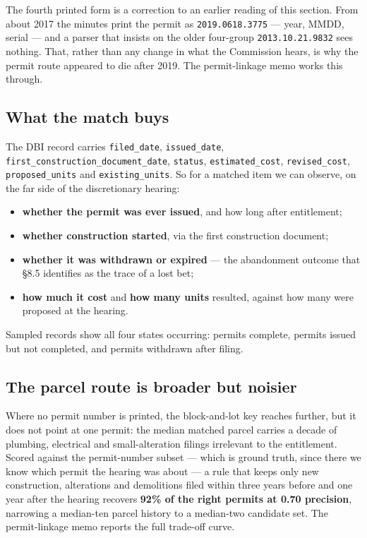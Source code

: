 \documentclass[11pt]{article}
\begin{document}
The fourth printed form is a correction to an earlier reading of this section. From about
2017 the minutes print the permit as \texttt{2019.0618.3775} --- year, MMDD, serial --- and a
parser that insists on the older four-group \texttt{2013.10.21.9832} sees nothing. That,
rather than any change in what the Commission hears, is why the permit route appeared to die
after 2019. The permit-linkage memo works this through.

\subsection{What the match buys}

The DBI record carries \texttt{filed\_date}, \texttt{issued\_date},
\texttt{first\_construction\_document\_date}, \texttt{status}, \texttt{estimated\_cost},
\texttt{revised\_cost}, \texttt{proposed\_units} and \texttt{existing\_units}. So for a matched
item we can observe, on the far side of the discretionary hearing:

\begin{itemize}
\item \textbf{whether the permit was ever issued}, and how long after entitlement;
\item \textbf{whether construction started}, via the first construction document;
\item \textbf{whether it was withdrawn or expired} --- the abandonment outcome that \S8.5
identifies as the trace of a lost bet;
\item \textbf{how much it cost} and \textbf{how many units} resulted, against how many were
proposed at the hearing.
\end{itemize}

Sampled records show all four states occurring: permits complete, permits issued but not
completed, and permits withdrawn after filing.

\subsection{The parcel route is broader but noisier}

Where no permit number is printed, the block-and-lot key reaches further, but it does not
point at one permit: the median matched parcel carries a decade of plumbing, electrical and
small-alteration filings irrelevant to the entitlement. Scored against the permit-number
subset --- which is ground truth, since there we know which permit the hearing was about ---
a rule that keeps only new construction, alterations and demolitions filed within three years
before and one year after the hearing recovers \textbf{92\% of the right permits at 0.70
precision}, narrowing a median-ten parcel history to a median-two candidate set. The
permit-linkage memo reports the full trade-off curve.
\end{document}
